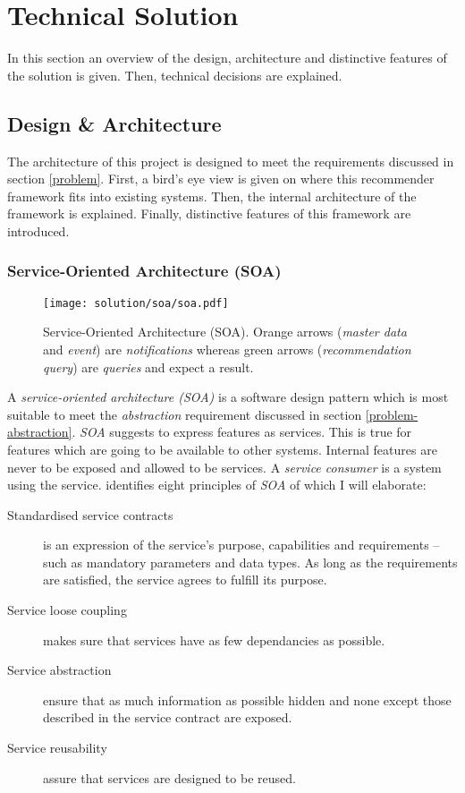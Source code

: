 \chapter{Technical Solution}

In this section an overview of the design, architecture and distinctive features of the solution is given. Then, technical decisions are explained.



\section{Design \& Architecture}

The architecture of this project is designed to meet the requirements discussed in section \ref{problem}. First, a bird's eye view is given on where this recommender framework fits into existing systems. Then, the internal architecture of the framework is explained. Finally, distinctive features of this framework are introduced.

\subsection{Service-Oriented Architecture (SOA)}
\label{sol-design-soa}

\begin{figure}[ht]
    \texttt{[image: solution/soa/soa.pdf]}
    \caption[Service-Oriented Architecture (SOA)]{Service-Oriented Architecture (SOA). Orange arrows (\emph{master data} and \emph{event}) are \emph{notifications} whereas green arrows (\emph{recommendation query}) are \emph{queries} and expect a result.}
    \label{fig:soa}
\end{figure}

A \emph{service-oriented architecture (SOA)} is a software design pattern which is most suitable to meet the \emph{abstraction} requirement discussed in section \ref{problem-abstraction}. \emph{SOA} suggests to express features as services. This is true for features which are going to be available to other systems. Internal features are never to be exposed and allowed to be services. A \emph{service consumer} is a system using the service. \cite{erl08} identifies eight principles of \emph{SOA} of which I will elaborate:

\begin{description}
    \item[Standardised service contracts] is an expression of the service's purpose, capabilities and requirements -- such as mandatory parameters and data types. As long as the requirements are satisfied, the service agrees to fulfill its purpose.
    \item[Service loose coupling] makes sure that services have as few dependancies as possible.
    \item[Service abstraction] ensure that as much information as possible hidden and none except those described in the service contract are exposed.
    \item[Service reusability] assure that services are designed to be reused.
\end{description}

